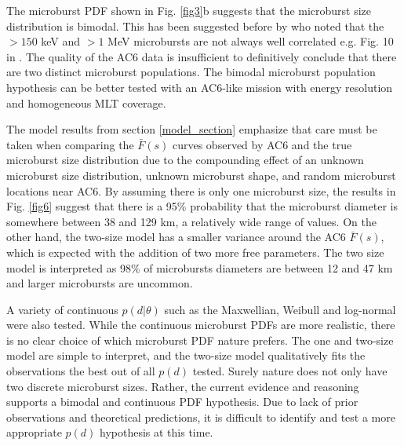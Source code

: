 \documentclass[draft]{agujournal2019}
\begin{document}
The microburst PDF shown in Fig. \ref{fig3}b suggests that the microburst size distribution is bimodal. This has been suggested before by  who noted that the $> 150$ keV and $> 1$ MeV microbursts are not always well correlated e.g. Fig. 10 in . The quality of the AC6 data is insufficient to definitively conclude that there are two distinct microburst populations. The bimodal microburst population hypothesis can be better tested with an AC6-like mission with energy resolution and homogeneous MLT coverage.

The model results from section \ref{model_section} emphasize that care must be taken when comparing the $\bar{F}(s)$ curves observed by AC6 and the true microburst size distribution due to the compounding effect of an unknown microburst size distribution, unknown microburst shape, and random microburst locations near AC6. By assuming there is only one microburst size, the results in Fig. \ref{fig6} suggest that there is a 95\% probability that the microburst diameter is somewhere between 38 and 129 km, a relatively wide range of values. On the other hand, the two-size model has a smaller variance around the AC6 $\bar{F}(s)$, which is expected with the addition of two more free parameters. The two size model is interpreted as 98\% of microbursts diameters are between 12 and 47 km and larger microbursts are uncommon. 

A variety of continuous $p(d | \theta)$ such as the Maxwellian, Weibull and log-normal were also tested. While the continuous microburst PDFs are more realistic, there is no clear choice of which microburst PDF nature prefers. The one and two-size model are simple to interpret, and the two-size model qualitatively fits the observations the best out of all $p(d)$ tested. Surely nature does not only have two discrete microburst sizes. Rather, the current evidence and reasoning supports a bimodal and continuous PDF hypothesis. Due to lack of prior observations and theoretical predictions, it is difficult to identify and test a more appropriate $p(d)$ hypothesis at this time.
\end{document}
